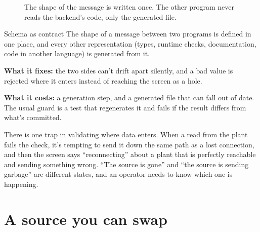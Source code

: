 \begin{figure}[htbp]
\centering
{}
\caption{The shape of the message is written once. The other program never
reads the backend's code, only the generated file.}
\end{figure}

\begin{concept}{Schema as contract}
The shape of a message between two programs is defined in one place, and every
other representation (types, runtime checks, documentation, code in another
language) is generated from it.

\textbf{What it fixes:} the two sides can't drift apart silently, and a bad
value is rejected where it enters instead of reaching the screen as a hole.

\textbf{What it costs:} a generation step, and a generated file that can fall
out of date. The usual guard is a test that regenerates it and fails if the
result differs from what's committed.
\end{concept}

There is one trap in validating where data enters. When a read from the plant
fails the check, it's tempting to send it down the same path as a lost
connection, and then the screen says ``reconnecting'' about a plant that is
perfectly reachable and sending something wrong. ``The source is gone'' and
``the source is sending garbage'' are different states, and an operator needs to
know which one is happening.

\section{A source you can swap}

